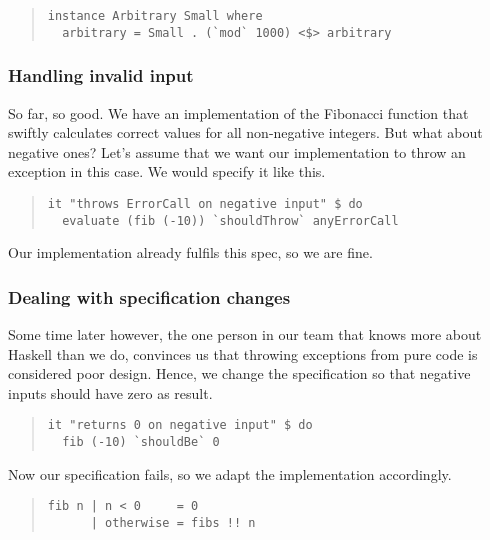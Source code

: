 \documentclass[preprint]{sigplanconf}
\begin{document}
\begin{quote}
\small
\begin{verbatim}
instance Arbitrary Small where
  arbitrary = Small . (`mod` 1000) <$> arbitrary
\end{verbatim}
\end{quote}


\subsubsection{Handling invalid input}

So far, so good.  We have an implementation of the Fibonacci function
that swiftly calculates correct values for all non-negative integers.
But what about negative ones? Let's assume that we want our
implementation to throw an exception in this case. We would
specify it like this.

\begin{quote}
\small
\begin{verbatim}
it "throws ErrorCall on negative input" $ do
  evaluate (fib (-10)) `shouldThrow` anyErrorCall
\end{verbatim}
\end{quote}

\noindent Our implementation already fulfils this spec, so we are
fine.

\subsubsection{Dealing with specification changes}

Some time later however, the one person in our team that knows
more about Haskell than we do, convinces us that throwing exceptions
from pure code is considered poor design. Hence, we change the
specification so that negative inputs should have zero as result.

\begin{quote}
\small
\begin{verbatim}
it "returns 0 on negative input" $ do
  fib (-10) `shouldBe` 0
\end{verbatim}
\end{quote}

\noindent Now our specification fails, so we adapt the implementation
accordingly.

\begin{quote}
\small
\begin{verbatim}
fib n | n < 0     = 0
      | otherwise = fibs !! n
\end{verbatim}
\end{quote}
\end{document}
